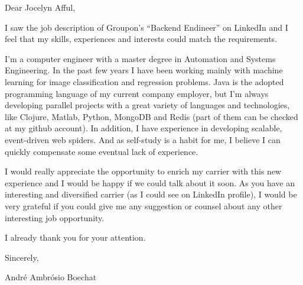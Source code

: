 \documentclass[10pt]{article}
\renewcommand{\section}[1]{\pagebreak[3]%
    \hyphenpenalty=10000%
    \vspace{1.3\baselineskip}%
    \phantomsection\addcontentsline{toc}{section}{#1}%
    \noindent\llap{\scshape\smash{\parbox[t]{\marginparwidth}{\raggedright #1}}}%
    \vspace{-\baselineskip}\par}
\begin{document}
\section{}

Dear Jocelyn Afful,
\vspace{.2cm}

I saw the job description of Groupon's ``Backend Endineer'' on LinkedIn and I feel 
that my skills, experiences and interests could match the requirements.
\vspace{.2cm}

I'm a computer engineer with a master degree in Automation and Systems Engineering.
In the past few years I have been working mainly with machine learning for image
classification and regression problems. Java is the adopted programming language of 
my current company employer, but I'm always developing parallel projects with a great
variety of languages and technologies, like Clojure, Matlab, Python, MongoDB and
Redis (part of them can be checked at my github account). In addition, I have
experience in developing scalable, event-driven web spiders.
And as self-study is a habit for me, I believe I can quickly compensate some eventual
lack of experience.
\vspace{.2cm}


I would really appreciate the opportunity to enrich my carrier with this new
experience and I would be happy if we could talk about it soon. As you have an 
interesting and diversified carrier (as I could see on LinkedIn profile), I would 
be very grateful if you could give me any suggestion or counsel about any other 
interesting job opportunity.
\vspace{.2cm}

I already thank you for your attention.
\vspace{.2cm}

Sincerely,
\vspace{.2cm}

André Ambrósio Boechat
\end{document}
